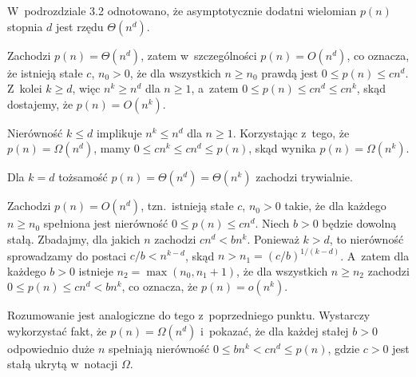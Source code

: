 W~podrozdziale 3.2 odnotowano, że asymptotycznie dodatni wielomian $p(n)$ stopnia $d$ jest rzędu $\Theta(n^d)$.

\subproblem %
Zachodzi $p(n)=\Theta(n^d)$, zatem w~szczególności $p(n)=O(n^d)$, co oznacza, że istnieją stałe $c$, $n_0>0$, że dla wszystkich $n\ge n_0$ prawdą jest $0\le p(n)\le cn^d$.
Z~kolei $k\ge d$, więc $n^k\ge n^d$ dla $n\ge1$, a~zatem $0\le p(n)\le cn^d\le cn^k$, skąd dostajemy, że $p(n)=O(n^k)$.

\subproblem %
Nierówność $k\le d$ implikuje $n^k\le n^d$ dla $n\ge1$.
Korzystając z~tego, że $p(n)=\Omega(n^d)$, mamy $0\le cn^k\le cn^d\le p(n)$, skąd wynika $p(n)=\Omega(n^k)$.

\subproblem %
Dla $k=d$ tożsamość $p(n)=\Theta(n^d)=\Theta(n^k)$ zachodzi trywialnie.

\subproblem %
Zachodzi $p(n)=O(n^d)$, tzn.\ istnieją stałe $c$, $n_0>0$ takie, że dla każdego $n\ge n_0$ spełniona jest nierówność $0\le p(n)\le cn^d$.
Niech $b>0$ będzie dowolną stałą.
Zbadajmy, dla jakich $n$ zachodzi $cn^d<bn^k$.
Ponieważ $k>d$, to nierówność sprowadzamy do postaci $c/b<n^{k-d}$, skąd $n>n_1=(c/b)^{1/(k-d)}$.
A~zatem dla każdego $b>0$ istnieje $n_2=\max(n_0,n_1+1)$, że dla wszystkich $n\ge n_2$ zachodzi $0\le p(n)\le cn^d<bn^k$, co oznacza, że $p(n)=o(n^k)$.

\subproblem %
Rozumowanie jest analogiczne do tego z~poprzedniego punktu.
Wystarczy wykorzystać fakt, że $p(n)=\Omega(n^d)$ i~pokazać, że dla każdej stałej $b>0$ odpowiednio duże $n$ spełniają nierówność $0\le bn^k<cn^d\le p(n)$, gdzie $c>0$ jest stałą ukrytą w~notacji $\Omega$.
